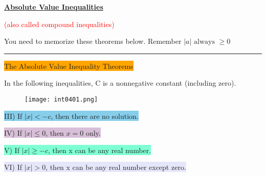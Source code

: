 
\vspace{0.6 cm}

\centerline{\underline{\textbf{\Large Absolute Value Inequalities}}}

\centerline{\textcolor{red}{(also called compound inequalities)}}

\vspace{0.3 cm}

You need to memorize these theorems below. Remember $|a| \text{ always } \geq 0$

\noindent\rule{\textwidth}{0.8pt}

\vspace{0.4 cm}

\centerline{\colorbox{orange}{\Large The Absolute Value Inequality Theorems}}

In the following inequalities, C is a nonnegative constant (including zero).

\begin{figure}[htb!]
  \centering
  \texttt{[image: int0401.png]}
\end{figure}

\colorbox{SkyBlue}{III) If $|x|<-c$, then there are no solution.}

\colorbox{Thistle}{IV) If $|x| \leq 0$, then $x=0$ only.}

\colorbox{Aquamarine}{V) If $|x| \geq -c$, then x can be any real number.}

\colorbox{Lavender}{VI) If $|x| > 0$, then x can be any real number except zero.}

\newpage

